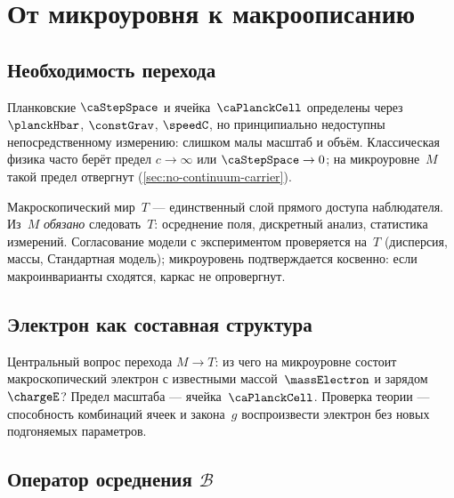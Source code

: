 \chapter{От микроуровня к макроописанию}
\label{ch:macro}

\section{Необходимость перехода}

Планковские $\caStepSpace$ и ячейка~$\PlanckCell$ определены через $\planckHbar$, $\constGrav$, $\speedC$,
но принципиально недоступны непосредственному измерению: слишком малы масштаб и объём.
Классическая физика часто берёт предел $c\to\infty$ или $\caStepSpace\to 0$;
на микроуровне~$M$ такой предел отвергнут (\cref{sec:no-continuum-carrier}).

Макроскопический мир~$T$ --- единственный слой прямого доступа наблюдателя.
Из~$M$ \emph{обязано} следовать~$T$: осреднение поля, дискретный анализ, статистика измерений.
Согласование модели с экспериментом проверяется на~$T$ (дисперсия, массы, Стандартная модель);
микроуровень подтверждается косвенно: если макроинварианты сходятся,
каркас не опровергнут.

\section{Электрон как составная структура}

Центральный вопрос перехода $M\to T$: из чего на микроуровне состоит
макроскопический электрон с известными массой~$\massElectron$ и зарядом~$\chargeE$?
Предел масштаба --- ячейка~$\PlanckCell$.
Проверка теории --- способность комбинаций ячеек и закона~$g$
воспроизвести электрон без новых подгоняемых параметров.

\section{Оператор осреднения \texorpdfstring{$\mathcal{B}$}{B}}
\label{sec:readout}

